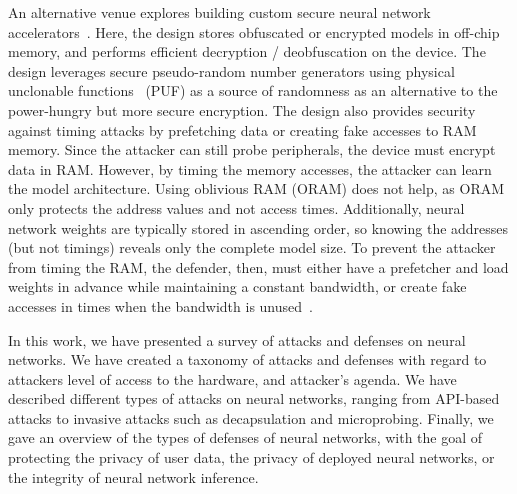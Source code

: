 An alternative venue explores building custom secure neural network accelerators~. Here, the design stores obfuscated or encrypted models in off-chip memory, and performs efficient decryption / deobfuscation on the device. The design leverages secure pseudo-random number generators using physical unclonable functions~ (PUF) as a source of randomness as an alternative to the power-hungry but more secure encryption. The design also provides security against timing attacks by prefetching data or creating fake accesses to RAM memory. 
Since the attacker can still probe peripherals, the device must encrypt data in RAM. However, by timing the memory accesses, the attacker can learn the model architecture. Using oblivious RAM (ORAM) does not help, as ORAM only protects the address values and not access times. Additionally, neural network weights are typically stored in ascending order, so knowing the addresses (but not timings) reveals only the complete model size. To prevent the attacker from timing the RAM, the defender, then, must either have a prefetcher and load weights in advance while maintaining a constant bandwidth, or create fake accesses in times when the bandwidth is unused~. 
\vspace{-0.1in}

In this work, we have presented a survey of attacks and defenses on neural networks. We have created a taxonomy of attacks and defenses with regard to attackers level of access to the hardware, and attacker's agenda. We have described different types of attacks on neural networks, ranging from API-based attacks to invasive attacks such as decapsulation and microprobing. Finally, we gave an overview of the types of defenses of neural networks, with the goal of protecting the privacy of user data, the privacy of deployed neural networks, or the integrity of neural network inference.


